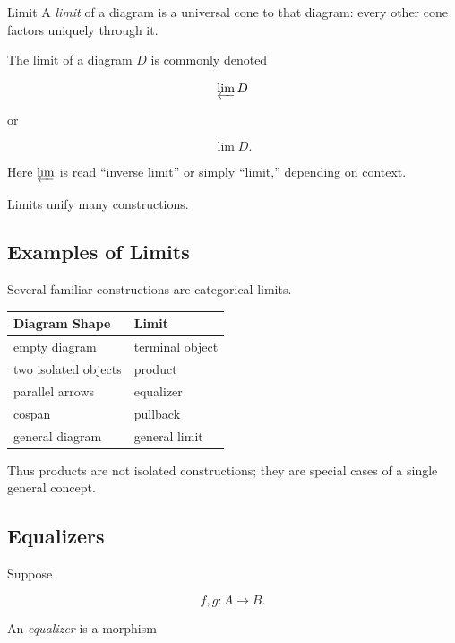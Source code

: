 \begin{definitionbox}{Limit}
A \emph{limit} of a diagram is a universal cone to that diagram: every other
cone factors uniquely through it.
\end{definitionbox}

The limit of a diagram \(D\) is commonly denoted

\[ \varprojlim D \]

or

\[ \lim D. \]

Here \(\varprojlim\) is read ``inverse limit'' or simply ``limit,'' depending
on context.

Limits unify many constructions.

\subsection{Examples of Limits}
\label{subsec:examples-limits}

Several familiar constructions are categorical limits.

\begin{center}
\begin{tabularx}{0.9\textwidth}{@{}lX@{}}
\toprule
\textbf{Diagram Shape} & \textbf{Limit}\\
\midrule
empty diagram & terminal object\\
two isolated objects & product\\
parallel arrows & equalizer\\
cospan & pullback\\
general diagram & general limit\\
\bottomrule
\end{tabularx}
\end{center}

Thus products are not isolated constructions; they are special cases of a
single general concept.

\subsection{Equalizers}
\label{subsec:equalizers}

Suppose

\[ f,g:A\to B. \]

An \emph{equalizer} is a morphism

